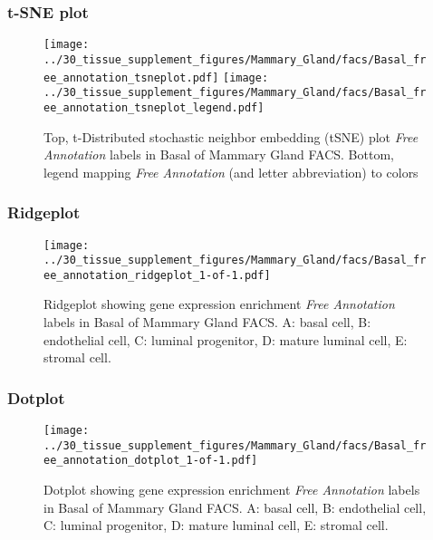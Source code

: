 \clearpage
\subsubsection{t-SNE plot}
\begin{figure}[h]
\centering
\texttt{[image: ../30\_tissue\_supplement\_figures/Mammary\_Gland/facs/Basal\_free\_annotation\_tsneplot.pdf]}
\texttt{[image: ../30\_tissue\_supplement\_figures/Mammary\_Gland/facs/Basal\_free\_annotation\_tsneplot\_legend.pdf]}
\caption{Top, t-Distributed stochastic neighbor embedding (tSNE) plot  \emph{Free Annotation} labels in Basal of Mammary Gland FACS. Bottom, legend mapping \emph{Free Annotation} (and letter abbreviation) to colors}
\end{figure}


\clearpage

\subsubsection{Ridgeplot}
\begin{figure}[h]
\centering
\texttt{[image: ../30\_tissue\_supplement\_figures/Mammary\_Gland/facs/Basal\_free\_annotation\_ridgeplot\_1-of-1.pdf]}

\caption{ Ridgeplot  showing gene expression enrichment \emph{Free Annotation} labels in Basal of Mammary Gland FACS. A: basal cell, B: endothelial cell, C: luminal progenitor, D: mature luminal cell, E: stromal cell.}
\end{figure}


\clearpage

\subsubsection{Dotplot}
\begin{figure}[h]
\centering
\texttt{[image: ../30\_tissue\_supplement\_figures/Mammary\_Gland/facs/Basal\_free\_annotation\_dotplot\_1-of-1.pdf]}

\caption{ Dotplot  showing gene expression enrichment \emph{Free Annotation} labels in Basal of Mammary Gland FACS. A: basal cell, B: endothelial cell, C: luminal progenitor, D: mature luminal cell, E: stromal cell.}
\end{figure}

